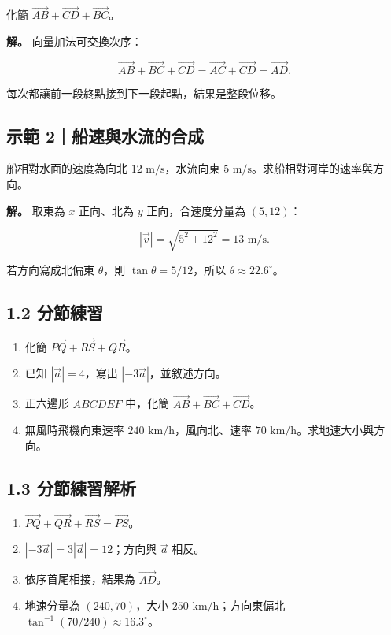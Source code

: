 \documentclass[11pt,a4paper]{article}
\providecommand{\tightlist}{%
  \setlength{\itemsep}{0pt}\setlength{\parskip}{0pt}}
\begin{document}
化簡 \(\overrightarrow{AB}+\overrightarrow{CD}+\overrightarrow{BC}\)。

\textbf{解。} 向量加法可交換次序：

\[
\overrightarrow{AB}+\overrightarrow{BC}+\overrightarrow{CD}
=\overrightarrow{AC}+\overrightarrow{CD}=\overrightarrow{AD}.
\]

每次都讓前一段終點接到下一段起點，結果是整段位移。

\subsection{示範 2｜船速與水流的合成}\label{ux793aux7bc4-2ux8239ux901fux8207ux6c34ux6d41ux7684ux5408ux6210}

船相對水面的速度為向北 \(12\text{ m/s}\)，水流向東 \(5\text{ m/s}\)。求船相對河岸的速率與方向。

\textbf{解。} 取東為 \(x\) 正向、北為 \(y\) 正向，合速度分量為 \((5,12)\)：

\[
|\vec v|=\sqrt{5^2+12^2}=13\text{ m/s}.
\]

若方向寫成北偏東 \(\theta\)，則 \(\tan\theta=5/12\)，所以 \(\theta\approx22.6^\circ\)。

\subsection{1.2 分節練習}\label{ux5206ux7bc0ux7df4ux7fd2}

\begin{enumerate}
\def\labelenumi{\arabic{enumi}.}
\tightlist
\item
  化簡 \(\overrightarrow{PQ}+\overrightarrow{RS}+\overrightarrow{QR}\)。
\item
  已知 \(|\vec a|=4\)，寫出 \(|-3\vec a|\)，並敘述方向。
\item
  正六邊形 \(ABCDEF\) 中，化簡 \(\overrightarrow{AB}+\overrightarrow{BC}+\overrightarrow{CD}\)。
\item
  無風時飛機向東速率 \(240\text{ km/h}\)，風向北、速率 \(70\text{ km/h}\)。求地速大小與方向。
\end{enumerate}

\subsection{1.3 分節練習解析}\label{ux5206ux7bc0ux7df4ux7fd2ux89e3ux6790}

\begin{enumerate}
\def\labelenumi{\arabic{enumi}.}
\tightlist
\item
  \(\overrightarrow{PQ}+\overrightarrow{QR}+\overrightarrow{RS}=\overrightarrow{PS}\)。
\item
  \(|-3\vec a|=3|\vec a|=12\)；方向與 \(\vec a\) 相反。
\item
  依序首尾相接，結果為 \(\overrightarrow{AD}\)。
\item
  地速分量為 \((240,70)\)，大小 \(250\text{ km/h}\)；方向東偏北 \(\tan^{-1}(70/240)\approx16.3^\circ\)。
\end{enumerate}
\end{document}
